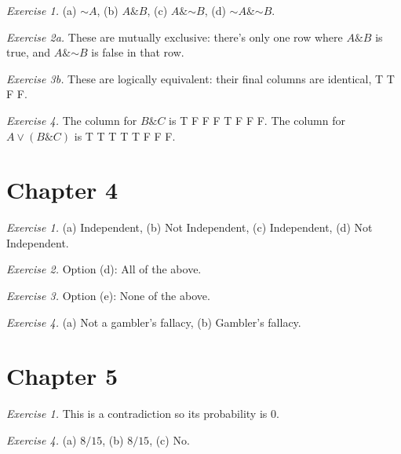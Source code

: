 \documentclass[justified]{tufte-book}
\renewcommand{\neg}{\mathbin{\sim}}
\renewcommand{\wedge}{\mathbin{\&}}
\theoremstyle{definition}
\theoremstyle{definition}
\theoremstyle{definition}
\theoremstyle{definition}
\theoremstyle{remark}
\begin{document}
\noindent
\emph{Exercise 1.} (a) \(\neg A\), (b) \(A \wedge B\), (c) \(A \wedge \neg B\), (d) \(\neg A \wedge \neg B\).

\vspace{.5em}

\noindent
\emph{Exercise 2a.} These are mutually exclusive: there's only one row where \(A \wedge B\) is true, and \(A \wedge \neg B\) is false in that row.

\vspace{.5em}

\noindent
\emph{Exercise 3b.} These are logically equivalent: their final columns are identical, T T F F.

\vspace{.5em}

\noindent
\emph{Exercise 4.} The column for \(B \wedge C\) is T F F F T F F F. The column for \(A \vee (B \wedge C)\) is T T T T T F F F.

\hypertarget{chapter-4}{%
\section*{Chapter 4}\label{chapter-4}}

\noindent
\emph{Exercise 1.} (a) Independent, (b) Not Independent, (c) Independent, (d) Not Independent.

\vspace{.5em}

\noindent
\emph{Exercise 2.} Option (d): All of the above.

\vspace{.5em}

\noindent
\emph{Exercise 3.} Option (e): None of the above.

\vspace{.5em}

\noindent
\emph{Exercise 4.} (a) Not a gambler's fallacy, (b) Gambler's fallacy.

\hypertarget{chapter-5}{%
\section*{Chapter 5}\label{chapter-5}}

\noindent
\emph{Exercise 1.} This is a contradiction so its probability is \(0\).

\vspace{.5em}

\noindent
\emph{Exercise 4.} (a) \(8/15\), (b) \(8/15\), (c) No.
\end{document}

